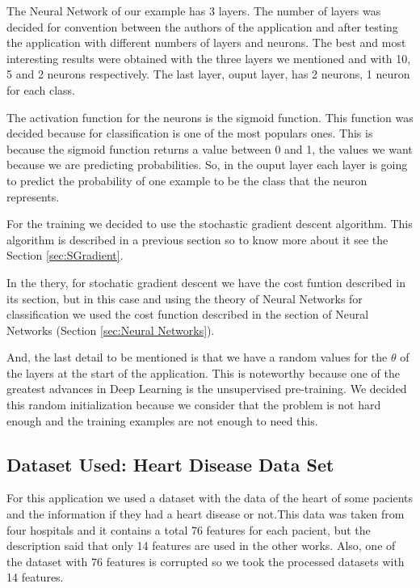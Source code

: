 \documentclass[12pt]{article}
\begin{document}
The Neural Network of our example has 3 layers.  The number of layers was decided for convention between the authors of the application and after testing the application with different numbers of layers and neurons. The best and most interesting results were obtained with the three layers we mentioned and with 10, 5 and 2 neurons respectively. The last layer, ouput layer, has 2 neurons, 1 neuron for each class.

The activation function for the neurons is the sigmoid function. This function was decided because for classification is one of the most populars ones. This is because the sigmoid function returns a value between 0 and 1, the values we want because we are predicting probabilities. So, in the ouput layer each layer is going to predict the probability of one example to be the class that the neuron represents.

For the training we decided to use the stochastic gradient descent algorithm. This algorithm is described in a previous section so to know more about it see the Section \ref{sec:SGradient}.

In the thery, for stochatic gradient descent we have the cost funtion described in its section, but in this case and using the theory of Neural Networks for classification we used the cost function described in the section of Neural Networks (Section \ref{sec:Neural Networks}).

And, the last detail to be mentioned is that we have a random values for the $\theta$ of the layers at the start of the application. This is noteworthy because one of the greatest advances in Deep Learning is the unsupervised pre-training\cite{erhan2010does,bengio2007greedy}. We decided this random initialization because we consider that the problem is not hard enough and the training examples are not enough to need this.

\subsection{Dataset Used: Heart Disease Data Set \cite{Lichman:2013}}
For this application we used a dataset with the data of the heart of some pacients and the information if they had a heart disease or not.This data was taken from four hospitals and it contains a total 76 features for each pacient, but the description said that only 14 features are used in the other works. Also, one of the dataset with 76 features is corrupted so we took the processed datasets with 14 features. \cite{heartDiseaseC,heartDiseaseZ,heartDiseaseH,heartDiseaseB}
\end{document}
